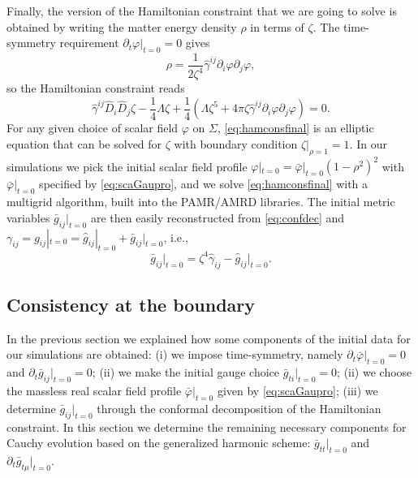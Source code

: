 \documentclass[a4paper,11pt]{article}
\numberwithin{equation}{section}
\begin{document}
Finally, the version of the Hamiltonian constraint that we are going to solve is obtained by writing the matter energy density $\rho$ in terms of $\zeta$. The time-symmetry requirement $\partial_t \varphi\big|_{t=0}=0$ gives
\begin{equation}
\label{eq:mattendens}
\rho=\frac{1}{2\zeta^4}\hat{\gamma}^{ij}\partial_i\varphi\partial_j\varphi,
\end{equation}
so the Hamiltonian constraint reads
\begin{equation}
\label{eq:hamconsfinal}
\hat{\gamma}^{ij}\hat{D}_i \hat{D}_j \zeta-\frac{1}{4}\Lambda\zeta+\frac{1}{4}(\Lambda\zeta^5+4\pi\zeta\hat{\gamma}^{ij}\partial_i\varphi\partial_j\varphi)=0.
\end{equation}
For any given choice of scalar field $\varphi$ on $\Sigma$, \eqref{eq:hamconsfinal} is an elliptic equation that can be solved for $\zeta$ with boundary condition $\zeta|_{\rho=1}=1$. In our simulations we pick the initial scalar field profile $\varphi|_{t=0}=\bar{\varphi}|_{t=0}(1-\rho^2)^2$ with $\bar{\varphi}|_{t=0}$ specified by \eqref{eq:scaGaupro}, and we solve \eqref{eq:hamconsfinal} with a multigrid algorithm, built into the PAMR/AMRD libraries.
The initial metric variables $\bar{g}_{ij}|_{t=0}$ are then easily reconstructed from \eqref{eq:confdec} and $\gamma_{ij}=g_{ij}|_{t=0}=\hat{g}_{ij}|_{t=0}+\bar{g}_{ij}|_{t=0}$, i.e.,
\begin{equation}
\bar{g}_{ij}\big|_{t=0}=\zeta^4\hat{\gamma}_{ij}-\hat{g}_{ij}\big|_{t=0}.
\end{equation}

\subsection{Consistency at the boundary}
\label{sec:consistbound}

In the previous section we explained how some components of the initial data for our simulations are obtained: (i) we impose time-symmetry, namely $\partial_t\bar{\varphi}|_{t=0}=0$ and $\partial_t\bar{g}_{ij}|_{t=0}=0$; (ii) we make the initial gauge choice $\bar{g}_{ti}|_{t=0}=0$; (ii) we choose the massless real scalar field profile $\bar{\varphi}|_{t=0}$ given by \eqref{eq:scaGaupro}; (iii) we determine $\bar{g}_{ij}|_{t=0}$ through the conformal decomposition of the Hamiltonian constraint. In this section we determine the remaining necessary components for Cauchy evolution based on the generalized harmonic scheme: $\bar{g}_{tt}|_{t=0}$ and $\partial_t\bar{g}_{t \mu}|_{t=0}$.
\end{document}
